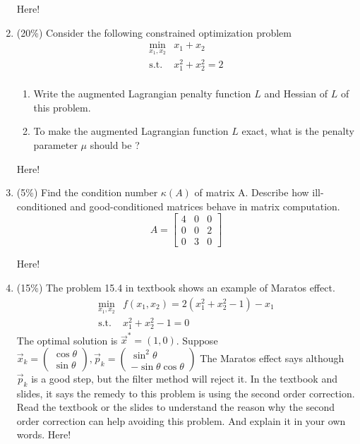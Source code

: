 \documentclass[a4paper,10pt]{article}
\begin{document}
\begin{enumerate}
{\color{blue} 
Here!
}

\item (20\%) Consider the following constrained optimization problem
\begin{equation}\label{(4)}
    \begin{array}{cc}
        \displaystyle\min_{x_1,x_2} & x_1 + x_2 \\
        \mbox{s.t.} & x_1^2 + x_2^2 = 2 \\
    \end{array}
\end{equation}
\begin{enumerate}
    \item Write the augmented Lagrangian penalty function $L$ 
and Hessian of $L$ of this problem. 
\item To make the augmented Lagrangian function $L$ exact, what is the penalty parameter $\mu$ should be ?
\end{enumerate}
{\color{blue} 
Here!
}


\item (5\%) Find the condition number $\kappa(A)$ of matrix A. Describe how ill-
conditioned and good-conditioned matrices behave in matrix computation.
\[
    A = \begin{bmatrix} 4 & 0 & 0 \\0 & 0 & 2 \\0 & 3 & 0 \end{bmatrix}
\]

{\color{blue} 
Here!
}

\item (15\%) The problem 15.4 in textbook shows an example of Maratos effect.
		\begin{align*}
		\min_{x_1, x_2} & f( x_1, x_2 ) = 2( x_1^2 + x_2^2 -1) -x_1\\
		\mbox{s.t. } & x_1^2 + x_2^2 -1=0
		\end{align*}
	The optimal solution is $\vec{x}^* = (1,0)$. Suppose 
	$\vec{x}_k =
		\left(
		\begin{array}{l}
			\cos \theta\\
			\sin \theta
		\end{array} \right),
		\vec{p}_k =
		\left(\begin{array}{c}
			\sin^2 \theta\\
			- \sin \theta \cos \theta
		\end{array} \right)$
	The Maratos effect says although $\vec{p}_k$ is a good step, but the filter method will reject it. In the textbook and slides, 
	it says the remedy to this problem is using the second order correction. Read the textbook or the slides to understand the reason why the second order correction can help avoiding this problem. And explain it in your own words. 
{\color{blue}
Here!
}

\end{enumerate}
\end{document}
